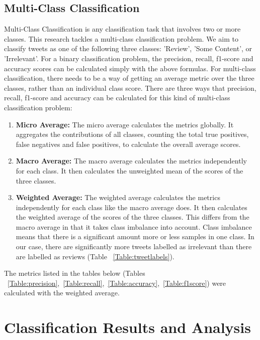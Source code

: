 \subsection{Multi-Class Classification}
Multi-Class Classification is any classification task that involves two or more classes. This research tackles a multi-class classification problem. We aim to classify tweets as one of the following three classes: 'Review', 'Some Content', or 'Irrelevant'. For a binary classification problem, the precision, recall, f1-score and accuracy scores can be calculated simply with the above formulas. For multi-class classification, there needs to be a way of getting an average metric over the three classes, rather than an individual class score.
There are three ways that precision, recall, f1-score and accuracy can be calculated for this kind of multi-class classification problem:
\begin{enumerate}
    \item \textbf{Micro Average:}\newline
    The micro average calculates the metrics globally. It aggregates the contributions of all classes, counting the total true positives, false negatives and false positives, to calculate the overall average scores.  
    \item \textbf{Macro Average:}\newline
    The macro average calculates the metrics independently for each class. It then calculates the unweighted mean of the scores of the three classes.
    \item \textbf{Weighted Average:}\newline
    The weighted average calculates the metrics independently for each class like the macro average does. It then calculates the weighted average of the scores of the three classes. This differs from the macro average in that it takes class imbalance into account. Class imbalance means that there is a significant amount more or less samples in one class. In our case, there are significantly more tweets labelled as irrelevant than there are labelled as reviews (Table ~\ref{Table:tweetlabels}).
\end{enumerate}

The metrics listed in the tables below (Tables ~\ref{Table:precision},~\ref{Table:recall},~\ref{Table:accuracy},~\ref{Table:f1score}) were calculated with the weighted average.

\section{Classification Results and Analysis}

